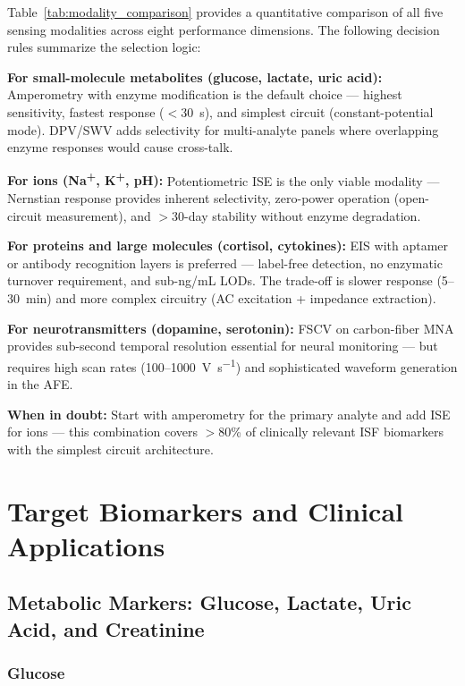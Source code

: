 \documentclass[review,1p]{elsarticle}
\begin{document}
Table~\ref{tab:modality_comparison} provides a quantitative comparison of all five sensing modalities across eight performance dimensions. The following decision rules summarize the selection logic:

\textbf{For small-molecule metabolites (glucose, lactate, uric acid):} Amperometry with enzyme modification is the default choice — highest sensitivity, fastest response ($<$30~s), and simplest circuit (constant-potential mode). DPV/SWV adds selectivity for multi-analyte panels where overlapping enzyme responses would cause cross-talk.

\textbf{For ions (Na\textsuperscript{+}, K\textsuperscript{+}, pH):} Potentiometric ISE is the only viable modality — Nernstian response provides inherent selectivity, zero-power operation (open-circuit measurement), and $>$30-day stability without enzyme degradation.

\textbf{For proteins and large molecules (cortisol, cytokines):} EIS with aptamer or antibody recognition layers is preferred — label-free detection, no enzymatic turnover requirement, and sub-ng/mL LODs. The trade-off is slower response (5--30~min) and more complex circuitry (AC excitation + impedance extraction).

\textbf{For neurotransmitters (dopamine, serotonin):} FSCV on carbon-fiber MNA provides sub-second temporal resolution essential for neural monitoring — but requires high scan rates (100--1000~V~s\textsuperscript{$-1$}) and sophisticated waveform generation in the AFE.

\textbf{When in doubt:} Start with amperometry for the primary analyte and add ISE for ions — this combination covers $>$80\% of clinically relevant ISF biomarkers with the simplest circuit architecture.


\section{Target Biomarkers and Clinical Applications}
\label{sec:biomarkers}

\subsection{Metabolic Markers: Glucose, Lactate, Uric Acid, and Creatinine}
\label{subsec:metabolic}

\subsubsection{Glucose}
\end{document}
